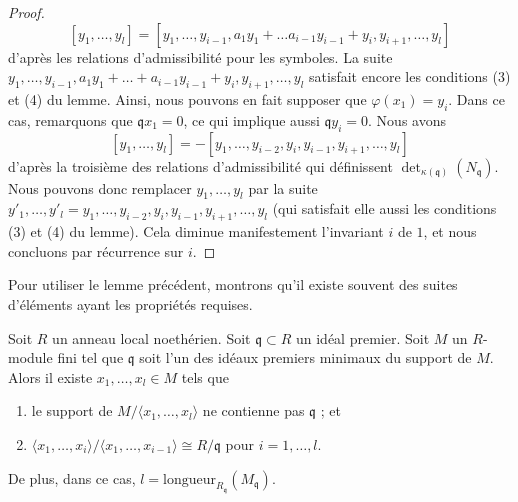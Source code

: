 \begin{proof}
$$
[y_1, \ldots, y_l] = [y_1, \ldots, y_{i - 1},
a_1y_1 + \ldots a_{i - 1}y_{i - 1} + y_i, y_{i + 1}, \ldots, y_l]
$$
d'après les relations d'admissibilité pour les symboles. La suite
$y_1, \ldots, y_{i - 1},
a_1y_1 + \ldots + a_{i - 1}y_{i - 1} + y_i, y_{i + 1}, \ldots, y_l$
satisfait encore les conditions (3) et (4) du lemme.
Ainsi, nous pouvons en fait
supposer que $\varphi(x_1) = y_i$. Dans ce cas, remarquons que
$\mathfrak q x_1 = 0$, ce qui implique aussi $\mathfrak q y_i = 0$.
Nous avons
$$
[y_1, \ldots, y_l] =
- [y_1, \ldots, y_{i - 2}, y_i, y_{i - 1}, y_{i + 1}, \ldots, y_l]
$$
d'après la troisième des relations d'admissibilité qui définissent
$\det_{\kappa(\mathfrak q)}(N_{\mathfrak q})$. Nous pouvons donc
remplacer $y_1, \ldots, y_l$ par
la suite
$y'_1, \ldots, y'_l =
y_1, \ldots, y_{i - 2}, y_i, y_{i - 1}, y_{i + 1}, \ldots, y_l$
(qui satisfait elle aussi les conditions (3) et (4) du lemme).
Cela diminue manifestement l'invariant $i$ de $1$, et nous concluons par récurrence
sur $i$.
\end{proof}

\noindent
Pour utiliser le lemme précédent, montrons qu'il existe souvent des suites d'éléments
ayant les propriétés requises.

\begin{lemma}
\label{lemma-good-sequence-exists}
Soit $R$ un anneau local noethérien.
Soit $\mathfrak q \subset R$ un idéal premier.
Soit $M$ un $R$-module fini tel que
$\mathfrak q$ soit l'un des idéaux premiers minimaux du support de $M$.
Alors il existe $x_1, \ldots, x_l \in M$ tels que
\begin{enumerate}
\item le support de $M / \langle x_1, \ldots, x_l\rangle$ ne contienne pas
$\mathfrak q$ ; et
\item $\langle x_1, \ldots, x_i\rangle / \langle x_1, \ldots, x_{i - 1}\rangle
\cong R/\mathfrak q$ pour $i = 1, \ldots, l$.
\end{enumerate}
De plus, dans ce cas, $l = \text{longueur}_{R_\mathfrak q}(M_\mathfrak q)$.
\end{lemma}

